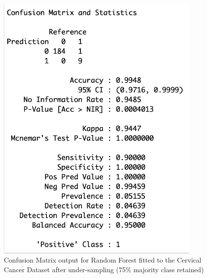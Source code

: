 \begin{figure}[!htbp]
    \centering
    \begin{minipage}{0.45\textwidth}
        \centering
        \includegraphics[width=0.9\textwidth]{ThesisTemplate/appendix/images/Chapter5Appendix/ConfusionMatrix75/CervicalCancer.png}
        \caption{Confusion Matrix output for Random Forest fitted to the Cervical Cancer Dataset after under-sampling (75\% majority class retained)}
        \label{fig:matrixCC75}
    \end{minipage}\hfill
    \begin{minipage}{0.45\textwidth}
        \centering

\end{minipage}
\end{figure}
